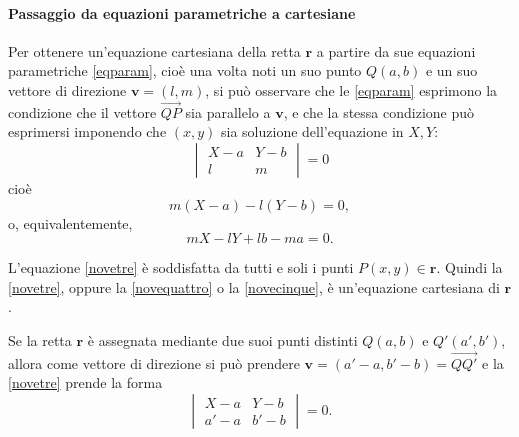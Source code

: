 \documentclass{article}
\theoremstyle{plain}
\theoremstyle{definition}
\theoremstyle{remark}
\begin{document}
\paragraph{Passaggio da equazioni parametriche a cartesiane}
Per ottenere un'equazione cartesiana della retta $\mathbf{r}$ a partire da sue equazioni parametriche \ref{eqparam}, cioè una volta noti un suo punto $Q(a, b)$ e un suo vettore di direzione $\mathbf{v} = (l, m)$, 
si può osservare che le \ref{eqparam} esprimono la condizione che il vettore $\overrightarrow{QP}$ sia parallelo a $\mathbf{v}$, e che la stessa condizione può esprimersi imponendo che $(x, y)$ sia soluzione dell'equazione in $X, Y$:
\begin{equation}\label{novetre}
\begin{vmatrix}
X - a & Y - b \\
l & m
\end{vmatrix} = 0 
\end{equation}
cioè
\begin{equation}\label{novequattro}
m(X - a) - l(Y - b) = 0,
\end{equation}
o, equivalentemente,
\begin{equation}\label{novecinque}
mX - lY + lb - ma = 0. 
\end{equation}

\vspace{10pt}

L'equazione \ref{novetre} è soddisfatta da tutti e soli i punti $P(x, y) \in \mathbf{r}$. 
Quindi la \ref{novetre}, oppure la \ref{novequattro} o la \ref{novecinque}, è un'equazione cartesiana di $\mathbf{r}$.

\vspace{10pt}

Se la retta $\mathbf{r}$ è assegnata mediante due suoi punti distinti $Q(a, b)$ e $Q'(a', b')$, allora come vettore di direzione si può prendere $\mathbf{v} = (a' - a, b' - b) = \overrightarrow{QQ'}$ e la \ref{novetre} prende la forma
\begin{equation}\label{novesei}
\begin{vmatrix}
X - a & Y - b \\
a' - a & b' - b
\end{vmatrix} = 0.    
\end{equation}

\vspace{10pt}
\end{document}
